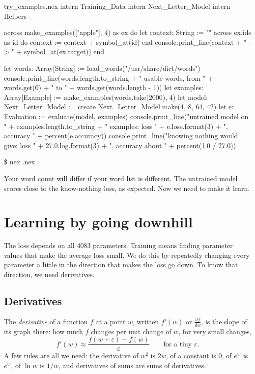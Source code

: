 \documentclass[11pt,a4paper,oneside,openany]{book}
\newcommand{\tryoutput}[1]{%
  \begin{tcolorbox}[outbox]
  {\ttfamily\footnotesize\color{outfg}\$ nex \detokenize{#1}.nex}\par\vspace{2pt}
  
  \end{tcolorbox}}
\begin{document}
\begin{tryit}{try_examples.nex}
intern Training_Data
intern Next_Letter_Model
intern Helpers

across make_examples(["apple"], 4) as ex do
  let context: String := ""
  across ex.ids as id do
    context := context + symbol_at(id)
  end
  console.print_line(context + " -> " + symbol_at(ex.target))
end

let words: Array[String] := load_words("/usr/share/dict/words")
console.print_line(words.length.to_string + " usable words, from "
  + words.get(0) + " to " + words.get(words.length - 1))
let examples: Array[Example] := make_examples(words.take(2000), 4)
let model: Next_Letter_Model := create Next_Letter_Model.make(4, 8, 64, 42)
let e: Evaluation := evaluate(model, examples)
console.print_line("untrained model on " + examples.length.to_string + " examples: loss "
  + e.loss.format(3) + ", accuracy " + percent(e.accuracy))
console.print_line("knowing nothing would give: loss " + 27.0.log.format(3)
  + ", accuracy about " + percent(1.0 / 27.0))
\end{tryit}
\tryoutput{try_examples}

Your word count will differ if your word list is different. The untrained
model scores close to the know-nothing loss, as expected. Now we need to
make it learn.

\chapter{Learning by going downhill}

The loss depends on all 4083 parameters. Training means finding parameter
values that make the average loss small. We do this by repeatedly
changing every parameter a little in the direction that makes the loss go
down. To know that direction, we need derivatives.

\section{Derivatives}

The \emph{derivative} of a function $f$ at a point $w$, written $f'(w)$
or $\frac{df}{dw}$, is the slope of its graph there: how much $f$ changes
per unit change of $w$, for very small changes,
\[
  f'(w) \approx \frac{f(w + \varepsilon) - f(w)}{\varepsilon}
  \qquad\text{for a tiny } \varepsilon .
\]
A few rules are all we need: the derivative of $w^2$ is $2w$, of a
constant is 0, of $e^{w}$ is $e^{w}$, of $\ln w$ is $1/w$, and
derivatives of sums are sums of derivatives.
\end{document}
